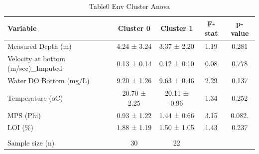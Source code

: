 
\begin{table}[htbp]
    \centering
    \small
    \caption{Table0 Env Cluster Anova}
    \label{tab:table0_env_cluster_anova}
    \begin{tabular}{lcccc}
        \toprule
        Variable & Cluster 0 & Cluster 1 & F-stat & p-value \\
        \midrule
        Measured Depth (m) & 4.24 ± 3.24 & 3.37 ± 2.20 & 1.19 & 0.281 \\
        Velocity  at bottom (m/sec)\_Imputed & 0.13 ± 0.14 & 0.12 ± 0.10 & 0.08 & 0.778 \\
        Water DO Bottom (mg/L) & 9.20 ± 1.26 & 9.63 ± 0.46 & 2.29 & 0.137 \\
        Temperature (oC) & 20.70 ± 2.25 & 20.11 ± 0.96 & 1.34 & 0.252 \\
        MPS (Phi) & 0.93 ± 1.22 & 1.44 ± 0.66 & 3.15 & 0.082. \\
        LOI (\%) & 1.88 ± 1.19 & 1.50 ± 1.05 & 1.43 & 0.237 \\
         &  &  &  &  \\
        Sample size (n) & 30 & 22 &  &  \\
        \bottomrule
    \end{tabular}
\end{table}
